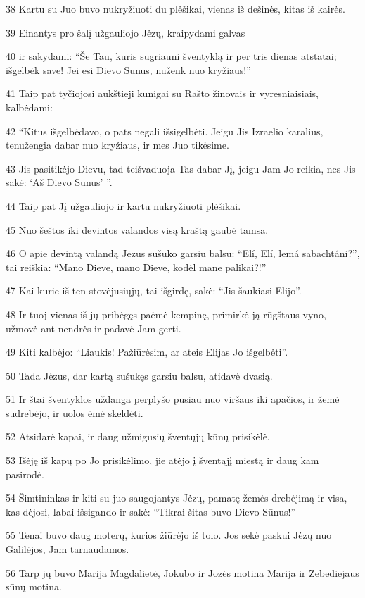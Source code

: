 \par 38 Kartu su Juo buvo nukryžiuoti du plėšikai, vienas iš dešinės, kitas iš kairės. 
\par 39 Einantys pro šalį užgauliojo Jėzų, kraipydami galvas 
\par 40 ir sakydami: “Še Tau, kuris sugriauni šventyklą ir per tris dienas atstatai; išgelbėk save! Jei esi Dievo Sūnus, nuženk nuo kryžiaus!” 
\par 41 Taip pat tyčiojosi aukštieji kunigai su Rašto žinovais ir vyresniaisiais, kalbėdami: 
\par 42 “Kitus išgelbėdavo, o pats negali išsigelbėti. Jeigu Jis Izraelio karalius, tenužengia dabar nuo kryžiaus, ir mes Juo tikėsime. 
\par 43 Jis pasitikėjo Dievu, tad teišvaduoja Tas dabar Jį, jeigu Jam Jo reikia, nes Jis sakė: ‘Aš Dievo Sūnus’ ”. 
\par 44 Taip pat Jį užgauliojo ir kartu nukryžiuoti plėšikai. 
\par 45 Nuo šeštos iki devintos valandos visą kraštą gaubė tamsa. 
\par 46 O apie devintą valandą Jėzus sušuko garsiu balsu: “Elí, Elí, lemá sabachtáni?”, tai reiškia: “Mano Dieve, mano Dieve, kodėl mane palikai?!” 
\par 47 Kai kurie iš ten stovėjusiųjų, tai išgirdę, sakė: “Jis šaukiasi Elijo”. 
\par 48 Ir tuoj vienas iš jų pribėgęs paėmė kempinę, primirkė ją rūgštaus vyno, užmovė ant nendrės ir padavė Jam gerti. 
\par 49 Kiti kalbėjo: “Liaukis! Pažiūrėsim, ar ateis Elijas Jo išgelbėti”. 
\par 50 Tada Jėzus, dar kartą sušukęs garsiu balsu, atidavė dvasią. 
\par 51 Ir štai šventyklos uždanga perplyšo pusiau nuo viršaus iki apačios, ir žemė sudrebėjo, ir uolos ėmė skeldėti. 
\par 52 Atsidarė kapai, ir daug užmigusių šventųjų kūnų prisikėlė. 
\par 53 Išėję iš kapų po Jo prisikėlimo, jie atėjo į šventąjį miestą ir daug kam pasirodė. 
\par 54 Šimtininkas ir kiti su juo saugojantys Jėzų, pamatę žemės drebėjimą ir visa, kas dėjosi, labai išsigando ir sakė: “Tikrai šitas buvo Dievo Sūnus!” 
\par 55 Tenai buvo daug moterų, kurios žiūrėjo iš tolo. Jos sekė paskui Jėzų nuo Galilėjos, Jam tarnaudamos. 
\par 56 Tarp jų buvo Marija Magdalietė, Jokūbo ir Jozės motina Marija ir Zebediejaus sūnų motina. 
